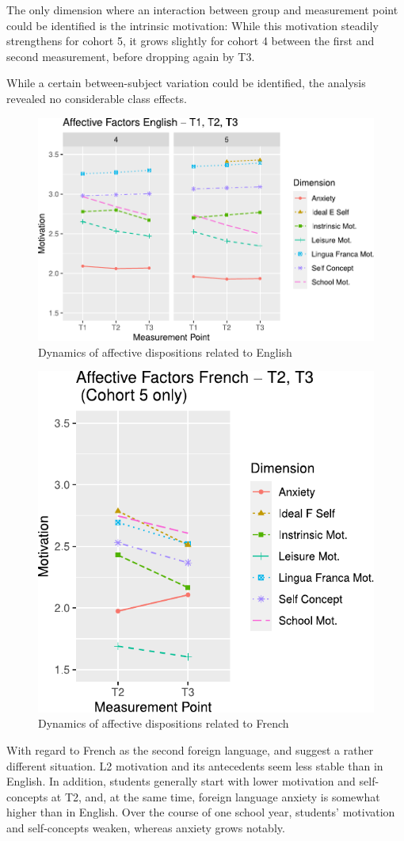 \documentclass[output=paper]{langsci/langscibook}
\begin{document}
The only dimension where an interaction between group and measurement point could be identified is the intrinsic motivation: While this motivation steadily strengthens for cohort 5, it grows slightly for cohort 4 between the first and second measurement, before dropping again by T3. 

While a certain between-subject variation could be identified, the analysis revealed no considerable class effects.

\begin{figure}
\includegraphics[width=\textwidth]{figures/Fig8.1.pdf}
\caption{Dynamics of affective dispositions related to English\label{fig:08:1}}
\end{figure}

\begin{figure}
\includegraphics[width=.5\textwidth]{figures/Fig8.2.pdf}
\caption{Dynamics of affective dispositions related to French\label{fig:08:2}}
\end{figure}

With regard to French as the second foreign language,   and   suggest a rather different situation. L2 motivation and its antecedents seem less stable than in English. In addition, students generally start with lower motivation and self-concepts at T2, and, at the same time, foreign language anxiety is somewhat higher than in English. Over the course of one school year, students’ motivation and self-concepts weaken, whereas anxiety grows notably.
\end{document}
